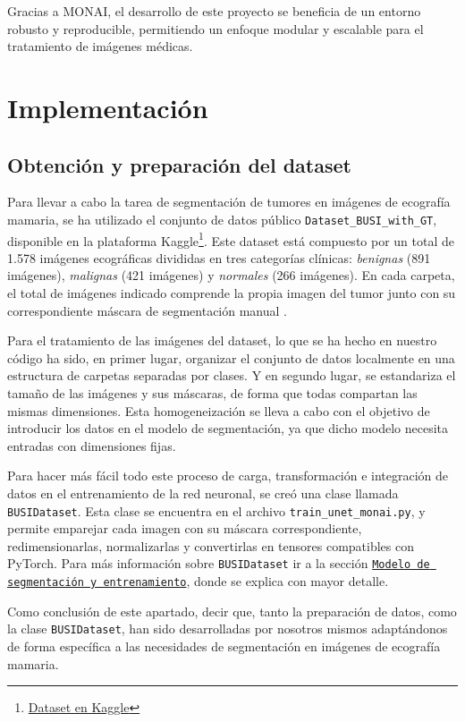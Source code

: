 \documentclass[12pt]{article}
\begin{document}
Gracias a MONAI, el desarrollo de este proyecto se beneficia de un entorno robusto y reproducible, permitiendo un enfoque modular y escalable para el tratamiento de imágenes médicas.



\section{Implementación}
\subsection{Obtención y preparación del dataset}

Para llevar a cabo la tarea de segmentación de tumores en imágenes de ecografía mamaria, se ha utilizado el conjunto de datos público \texttt{Dataset\_BUSI\_with\_GT}, disponible en la plataforma Kaggle\footnote{\href{https://www.kaggle.com/datasets/aryashah2k/breast-ultrasound-images-dataset}{Dataset en Kaggle}}. Este dataset está compuesto por un total de 1.578 imágenes ecográficas divididas en tres categorías clínicas: \textit{benignas} (891 imágenes), \textit{malignas} (421 imágenes) y \textit{normales} (266 imágenes). En cada carpeta, el total de imágenes indicado comprende la propia imagen del tumor junto con su correspondiente máscara de segmentación manual \cite{al2020dataset}.

Para el tratamiento de las imágenes del dataset, lo que se ha hecho en nuestro código ha sido, en primer lugar, organizar el conjunto de datos localmente en una estructura de carpetas separadas por clases. Y en segundo lugar, se estandariza el tamaño de las imágenes y sus máscaras, de forma que todas compartan las mismas dimensiones. Esta homogeneización se lleva a cabo con el objetivo de introducir los datos en el modelo de segmentación, ya que dicho modelo necesita entradas con dimensiones fijas.

Para hacer más fácil todo este proceso de carga, transformación e integración de datos en el entrenamiento de la red neuronal, se creó una clase llamada \texttt{BUSIDataset}. Esta clase se encuentra en el archivo \texttt{train\_unet\_monai.py}, y permite emparejar cada imagen con su máscara correspondiente, redimensionarlas, normalizarlas y convertirlas en tensores compatibles con PyTorch. Para más información sobre \texttt{BUSIDataset} ir a la sección \hyperref[sec:entrenamiento]{\texttt{Modelo de segmentación y entrenamiento}}, donde se explica con mayor detalle.

Como conclusión de este apartado, decir que, tanto la preparación de datos, como la clase \texttt{BUSIDataset}, han sido desarrolladas por nosotros mismos adaptándonos de forma específica a las necesidades de segmentación en imágenes de ecografía mamaria.
\end{document}

